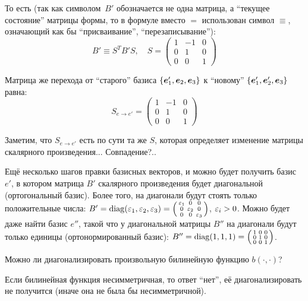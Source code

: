 \documentclass[a4paper,12pt]{article}
\begin{document}
\begin{example}
    То есть (так как символом~$B'$ обозначается не одна матрица, а ``текущее состояние'' матрицы формы, то в формуле вместо $=$ использован символ $\equiv$, означающий как бы ``присваивание'', ``перезаписывание''):
    \[
      B' \equiv S^T B' S,\quad S = \begin{pmatrix}
        1 & -1 & 0\\
        0 & 1  & 0\\
        0 & 0  & 1
      \end{pmatrix}
    \]
    
    Матрица же перехода от ``старого'' базиса $\{\boldsymbol e_1', \boldsymbol e_2, \boldsymbol e_3\}$ к ``новому'' $\{\boldsymbol e_1', \boldsymbol e_2', \boldsymbol e_3\}$ равна:
    \[
      S_{e \to e'} = \begin{pmatrix}
        1 & -1 & 0\\
        0 & 1  & 0\\
        0 & 0  & 1
      \end{pmatrix}
    \]
    
    Заметим, что $S_{e \to e'}$ есть по сути та же $S$, которая определяет изменение матрицы скалярного произведения... Совпадение?..
    
    Ещё несколько шагов правки базисных векторов, и можно будет получить базис~$e'$, в котором матрица $B'$ скалярного произведения будет диагональной (ортогональный базис).
    Более того, на диагонали будут стоять только положительные числа: $B' \hm= \diag(\eps_1, \eps_2, \eps_3) \hm= \left(\begin{smallmatrix} \eps_1 & 0 & 0 \\ 0 & \eps_2 & 0 \\ 0 & 0 & \eps_3 \end{smallmatrix}\right)$, $\eps_i \hm> 0$.
    Можно будет даже найти базис $e''$, такой что у диагональной матрицы $B''$ на диагонали будут только единицы (ортонормированный базис): $B'' \hm= \diag(1, 1, 1) \hm= \left(\begin{smallmatrix} 1 & 0 & 0 \\ 0 & 1 & 0 \\ 0 & 0 & 1 \end{smallmatrix}\right)$.
  \end{example}
  
  Можно ли диагонализировать произвольную билинейную функцию $b(\cdot, \cdot)$?
  
  Если билинейная функция несимметричная, то ответ ``нет'', её диагонализировать не получится (иначе она не была бы несимметричной).
  
\end{document}
